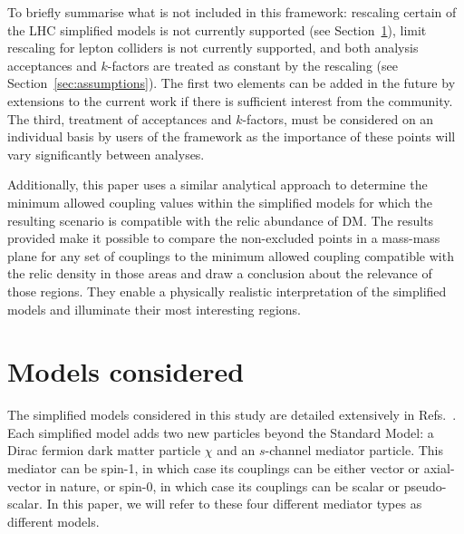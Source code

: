 \documentclass[a4paper, 11pt]{article}
\begin{document}
To briefly summarise what is not included in this framework: rescaling certain of the LHC simplified models is not currently supported (see Section~\ref{sec:models}), limit rescaling for lepton colliders is not currently supported, and both analysis acceptances and $k$-factors are treated as constant by the rescaling (see Section~\ref{sec:assumptions}). The first two elements can be added in the future by extensions to the current work if there is sufficient interest from the community. The third, treatment of acceptances and $k$-factors, must be considered on an individual basis by users of the framework as the importance of these points will vary significantly between analyses.

Additionally, this paper uses a similar analytical approach to determine the minimum allowed coupling values within the simplified models for which the resulting scenario is compatible with the relic abundance of DM. The results provided make it possible to compare the non-excluded points in a mass-mass plane for any set of couplings to the minimum allowed coupling compatible with the relic density in those areas and draw a conclusion about the relevance of those regions. They enable a physically realistic interpretation of the simplified models and illuminate their most interesting regions.

\section{Models considered}
\label{sec:models}

The simplified models considered in this study are detailed extensively in Refs.~\cite{ABERCROMBIE2020100371,ALBERT2019100377}. Each simplified model adds two new particles beyond the Standard Model: a Dirac fermion dark matter particle $\chi$ and an $s$-channel mediator particle. This mediator can be spin-1, in which case its couplings can be either vector or axial-vector in nature, or spin-0, in which case its couplings can be scalar or pseudo-scalar. In this paper, we will refer to these four different mediator types as different models.
\end{document}
